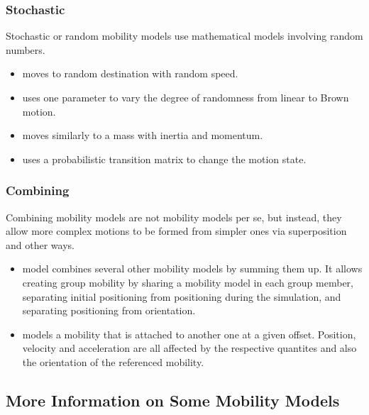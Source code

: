 \subsubsection*{Stochastic}

Stochastic or random mobility models use mathematical models involving random numbers.

\begin{itemize}
    \item {} moves to random destination with random speed.
    \item {} uses one parameter to vary the degree of randomness from linear to Brown motion.
    \item {} moves similarly to a mass with inertia and momentum.
    \item {} uses a probabilistic transition matrix to change the motion state.
\end{itemize}

\subsubsection*{Combining}

Combining mobility models are not mobility models per se, but instead, they
allow more complex motions to be formed from simpler ones via superposition 
and other ways. 

\begin{itemize}
        \item {} model combines several other mobility models by summing them up. It allows creating group mobility by sharing a mobility model in each group member, separating initial positioning from positioning during the simulation, and separating positioning from orientation.
        \item {} models a mobility that is attached to another one at a given offset. Position, velocity and acceleration are all affected by the respective quantites and also the orientation of the referenced mobility.
\end{itemize}

\subsection{More Information on Some Mobility Models}


